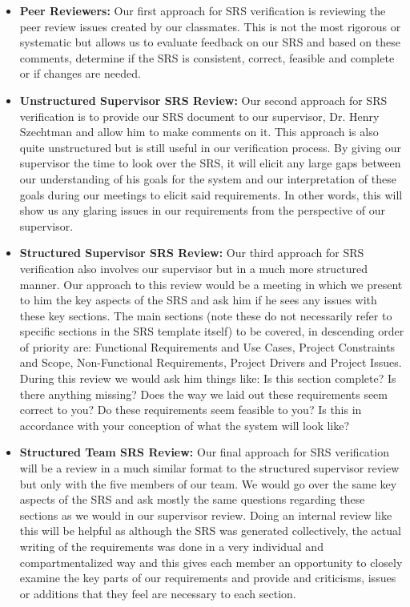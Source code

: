 \documentclass[12pt, titlepage]{article}
\begin{document}
\begin{itemize}

  \item{\textbf{Peer Reviewers: } Our first approach for SRS verification is reviewing the peer review issues created by our classmates. This
  is not the most rigorous or systematic but allows us to evaluate feedback on our SRS and based on these comments, determine if the SRS is consistent,
  correct, feasible and complete or if changes are needed.}
  \item{\textbf{ Unstructured Supervisor SRS Review: } Our second approach for SRS verification is to provide our SRS document to our supervisor, Dr. Henry Szechtman and
  allow him to make comments on it. This approach is also quite unstructured but is still useful in our verification process. By giving our supervisor
  the time to look over the SRS, it will elicit any large gaps between our understanding of his goals for the system and our interpretation of these goals
  during our meetings to elicit said requirements. In other words, this will show us any glaring issues in our requirements from the perspective of our
  supervisor.}
  \item{\textbf{Structured Supervisor SRS Review: } Our third approach for SRS verification also involves our supervisor but in a much more structured manner.
  Our approach to this review would be a meeting in which we present to him the key aspects of the SRS and ask him if he sees any issues with these key sections.
  The main sections (note these do not necessarily refer to specific sections in the SRS template itself) to be covered, in descending order of priority are: Functional Requirements and Use Cases, Project Constraints and Scope, Non-Functional Requirements, Project
  Drivers and Project Issues. During this review we would ask him things like: Is this section complete? Is there anything missing? Does the way we laid out
  these requirements seem correct to you? Do these requirements seem feasible to you? Is this in accordance with your conception of what the system will look like?}
  \item{\textbf{Structured Team SRS Review: } Our final approach for SRS verification will be a review in a much similar format to the structured supervisor
  review but only with the five members of our team. We would go over the same key aspects of the SRS and ask mostly the same questions regarding these sections
  as we would in our supervisor review. Doing an internal review like this will be helpful as although the SRS was generated collectively, the actual writing
  of the requirements was done in a very individual and compartmentalized way and this gives each member an opportunity to closely examine the key parts of our
  requirements and provide and criticisms, issues or additions that they feel are necessary to each section.}
\end{itemize}
\end{document}
